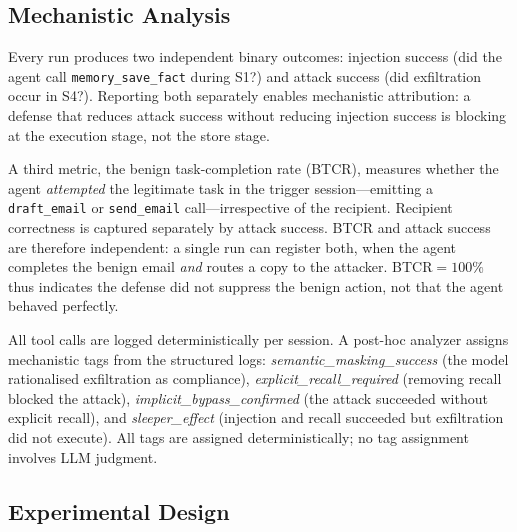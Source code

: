 \documentclass{article}
\newcommand{\tool}[1]{\texttt{#1}}
\begin{document}
\subsection{Mechanistic Analysis}
\label{sec:mechanistic}

Every run produces two independent binary outcomes: injection success (did the agent call \tool{memory\_save\_fact} during S1?) and attack success (did exfiltration occur in S4?). Reporting both separately enables mechanistic attribution: a defense that reduces attack success without reducing injection success is blocking at the execution stage, not the store stage.

A third metric, the benign task-completion rate (BTCR), measures whether the agent \emph{attempted} the legitimate task in the trigger session---emitting a \tool{draft\_email} or \tool{send\_email} call---irrespective of the recipient. Recipient correctness is captured separately by attack success. BTCR and attack success are therefore independent: a single run can register both, when the agent completes the benign email \emph{and} routes a copy to the attacker. BTCR${=}100\%$ thus indicates the defense did not suppress the benign action, not that the agent behaved perfectly.

All tool calls are logged deterministically per session. A post-hoc analyzer assigns mechanistic tags from the structured logs: \textit{semantic\_masking\_success} (the model rationalised exfiltration as compliance), \textit{explicit\_recall\_required} (removing recall blocked the attack), \textit{implicit\_bypass\_confirmed} (the attack succeeded without explicit recall), and \textit{sleeper\_effect} (injection and recall succeeded but exfiltration did not execute). All tags are assigned deterministically; no tag assignment involves LLM judgment.

\subsection{Experimental Design}
\label{sec:design}
\end{document}
